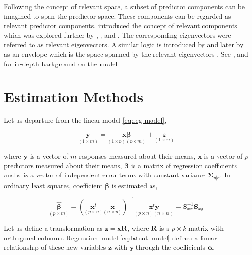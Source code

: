 \documentclass[12pt,3p,authoryear]{elsarticle}
\begin{document}
Following the concept of relevant space, a subset of predictor
components can be imagined to span the predictor space. These components
can be regarded as relevant predictor components. \citet{Naes1985}
introduced the concept of relevant components which was explored further
by \citet{helland1990partial}, \citet{naes1993relevant},
\citet{Helland1994b} and \citet{Helland2000}. The corresponding
eigenvectors were referred to as relevant eigenvectors. A similar logic
is introduced by \citet{cook2010envelope} and later by
\citet{cook2013envelopes} as an envelope which is the space spanned by
the relevant eigenvectors \citep[, p.101]{cook2018envelope}. See
\citet{Rimal2018}, \citet{saebo2015simrel} and \citet{rimal2019pred} for
in-depth background on the model.

\section{Estimation Methods}\label{estimation-methods}

Let us departure from the linear model \eqref{eq:reg-model},

\begin{equation}
\underset{(1\times m)}{\mathbf{y}} =
  \underset{(1\times p)(p\times m)}
    {\mathbf{x}\boldsymbol{\beta}} +
  \underset{(1 \times m)}{\boldsymbol{\varepsilon}}
\label{eq:reg-model}
\end{equation}

where \(\mathbf{y}\) is a vector of \(m\) responses measured about their
means, \(\mathbf{x}\) is a vector of \(p\) predictors measured about
their means, \(\boldsymbol{\beta}\) is a matrix of regression
coefficients and \(\boldsymbol{\varepsilon}\) is a vector of independent
error terms with constant variance \(\boldsymbol{\Sigma}_{y|x}\). In
ordinary least squares, coefficient \(\boldsymbol{\beta}\) is estimated
as,

\begin{equation}
\underset{(p\times m)}{\boldsymbol{\hat{\beta}}} =
  \left(\underset{(p\times n)}{\mathbf{x}^t}
  \underset{(n\times p)}{\mathbf{x}}\right)^{-1}
  \underset{(p \times n)(n \times m)}{\mathbf{x}^t\mathbf{y}} =
  \mathbf{S}_{xx}^{-1}\mathbf{S}_{xy}
\label{eq:ols-coef}
\end{equation}

Let us define a transformation as \(\mathbf{z} = \mathbf{xR}\), where
\(\mathbf{R}\) is a \(p\times k\) matrix with orthogonal columns.
Regression model \eqref{eq:latent-model} defines a linear relationship of
these new variables \(\mathbf{z}\) with \(\mathbf{y}\) through the
coefficients \(\boldsymbol{\alpha}\).
\end{document}
